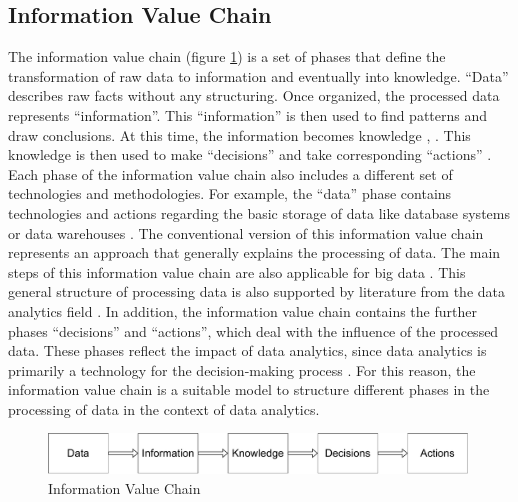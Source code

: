 \subsection{Information Value Chain}
\label{subsec:informationValueChainSubSection}

The information value chain (figure \ref{information_value_chain}) is a set of phases that define the transformation of raw data to information and eventually into knowledge. \enquote{Data} describes raw facts without any structuring. Once organized, the processed data represents \enquote{information}. This \enquote{information} is then used to find patterns and draw conclusions. At this time, the information becomes knowledge \parencite{Fayyad.1996}, \cite{Fayyad.1996b}. This knowledge is then used to make \enquote{decisions} and take corresponding \enquote{actions} \parencite{Sharma.2014}. Each phase of the information value chain also includes a different set of technologies and methodologies. For example, the \enquote{data} phase contains technologies and actions regarding the basic storage of data like database systems or data warehouses \parencite{Abbasi.2016}. The conventional version of this information value chain represents an approach that generally explains the processing of data. The main steps of this information value chain are also applicable for big data \parencite{Abbasi.2016}. This general structure of processing data is also supported by literature from the data analytics field \parencite{Runkler.2020}. In addition, the information value chain contains the further phases \enquote{decisions} and \enquote{actions}, which deal with the influence of the processed data. These phases reflect the impact of data analytics, since data analytics is primarily a technology for the decision-making process \parencite{Runkler.2020}. For this reason, the information value chain is a suitable model to structure different phases in the processing of data in the context of data analytics. %



\begin{figure}[]
    \includegraphics[width=0.99\textwidth, keepaspectratio]{content/02_theretical_foundations/informationValueChain.pdf}
    \caption{Information Value Chain}    
    \label{information_value_chain}
\end{figure}

